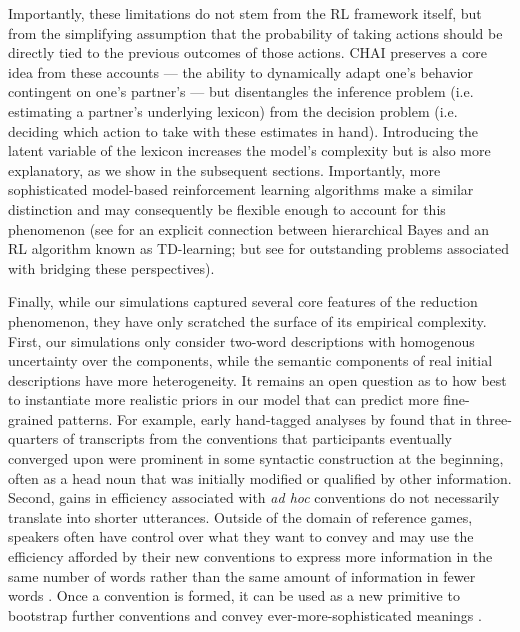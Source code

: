 Importantly, these limitations do not stem from the RL framework itself, but from the simplifying assumption that the probability of taking actions should be directly tied to the previous outcomes of those actions.
CHAI preserves a core idea from these accounts --- the ability to dynamically adapt one's behavior contingent on one's partner's --- but disentangles the inference problem (i.e. estimating a partner's underlying lexicon) from the decision problem (i.e. deciding which action to take with these estimates in hand).
Introducing the latent variable of the lexicon increases the model's complexity but is also more explanatory, as we show in the subsequent sections. 
Importantly, more sophisticated model-based reinforcement learning algorithms make a similar distinction and may consequently be flexible enough to account for this phenomenon (see  for an explicit connection between hierarchical Bayes and an RL algorithm known as TD-learning; but see  for outstanding problems associated with bridging these perspectives).

Finally, while our simulations captured several core features of the reduction phenomenon, they have only scratched the surface of its empirical complexity.
First, our simulations only consider two-word descriptions with homogenous uncertainty over the components, while the semantic components of real initial descriptions have more heterogeneity. 
It remains an open question as to how best to instantiate more realistic priors in our model that can predict more fine-grained patterns. 
For example, early hand-tagged analyses by  found that in three-quarters of transcripts from  the conventions that participants eventually converged upon were prominent in some syntactic construction at the beginning, often as a head noun that was initially modified or qualified by other information. 
Second, gains in efficiency associated with \emph{ad hoc} conventions do not necessarily translate into shorter utterances.
Outside of the domain of reference games, speakers often have control over what they want to convey and may use the efficiency afforded by their new conventions to express more information in the same number of words rather than the same amount of information in fewer words \cite{effenberger2021analysis}. 
Once a convention is formed, it can be used as a new primitive to bootstrap further conventions and convey ever-more-sophisticated meanings \cite{mccarthy2021learning}.





